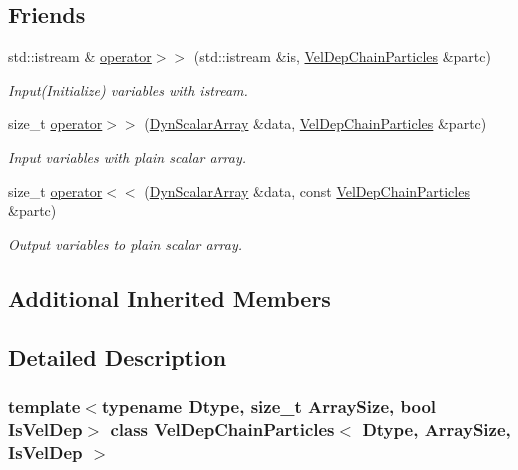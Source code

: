 \subsection*{Friends}
\begin{DoxyCompactItemize}
\item 
std\+::istream \& \mbox{\hyperlink{class_vel_dep_chain_particles_aa49e7bdbd28850629b79699eadb04d9c}{operator$>$$>$}} (std\+::istream \&is, \mbox{\hyperlink{class_vel_dep_chain_particles}{Vel\+Dep\+Chain\+Particles}} \&partc)
\begin{DoxyCompactList}\small\item\em Input(\+Initialize) variables with istream. \end{DoxyCompactList}\item 
size\+\_\+t \mbox{\hyperlink{class_vel_dep_chain_particles_a506a2f8ac8bbbb995d5ec6cb1f28cbb9}{operator$>$$>$}} (\mbox{\hyperlink{class_vel_indep_particles_a6bba8ac3f941a144214037a27ccaa119}{Dyn\+Scalar\+Array}} \&data, \mbox{\hyperlink{class_vel_dep_chain_particles}{Vel\+Dep\+Chain\+Particles}} \&partc)
\begin{DoxyCompactList}\small\item\em Input variables with plain scalar array. \end{DoxyCompactList}\item 
size\+\_\+t \mbox{\hyperlink{class_vel_dep_chain_particles_a6544571a675616104a236ad0b4504a73}{operator$<$$<$}} (\mbox{\hyperlink{class_vel_indep_particles_a6bba8ac3f941a144214037a27ccaa119}{Dyn\+Scalar\+Array}} \&data, const \mbox{\hyperlink{class_vel_dep_chain_particles}{Vel\+Dep\+Chain\+Particles}} \&partc)
\begin{DoxyCompactList}\small\item\em Output variables to plain scalar array. \end{DoxyCompactList}\end{DoxyCompactItemize}
\subsection*{Additional Inherited Members}


\subsection{Detailed Description}
\subsubsection*{template$<$typename Dtype, size\+\_\+t Array\+Size, bool Is\+Vel\+Dep$>$\newline
class Vel\+Dep\+Chain\+Particles$<$ Dtype, Array\+Size, Is\+Vel\+Dep $>$}




